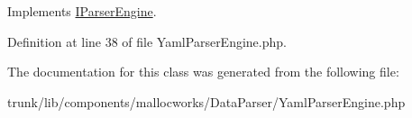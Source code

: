 Implements \hyperlink{interface_utopia_1_1_components_1_1_data_parser_1_1_i_parser_engine_a0e48ec53c3dc0fdc3918ca54041744e7}{IParserEngine}.



Definition at line 38 of file YamlParserEngine.php.



The documentation for this class was generated from the following file:\begin{DoxyCompactItemize}
\item 
trunk/lib/components/mallocworks/DataParser/YamlParserEngine.php\end{DoxyCompactItemize}
